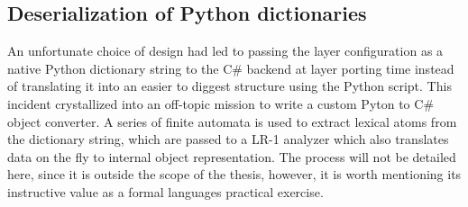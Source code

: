 \subsection{Deserialization of Python dictionaries}
\label{subsec:ch6sec4subsec2}

An unfortunate choice of design had led to passing the layer configuration as a native Python dictionary string to the C\# backend at layer porting time instead of translating it into an easier to diggest structure using the Python script. This incident crystallized into an off-topic mission to write a custom Pyton to C\# object converter. A series of finite automata is used to extract lexical atoms from the dictionary string, which are passed to a LR-1 analyzer which also translates data on the fly to internal object representation. The process will not be detailed here, since it is outside the scope of the thesis, however, it is worth mentioning its instructive value as a formal languages practical exercise.  